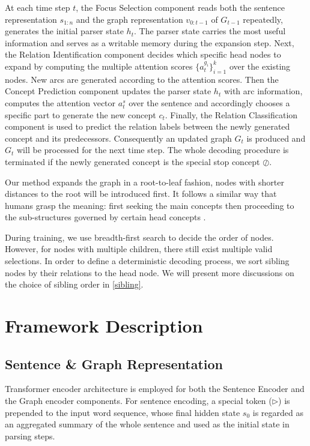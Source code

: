 \documentclass[11pt,a4paper]{article}
\begin{document}
	At each time step $t$, the Focus Selection component reads both the sentence representation $s_{1:n}$ and the graph representation $v_{0:t-1}$ of $G_{t-1}$ repeatedly, generates the initial parser state $h_t$. The parser state carries the most useful information and serves as a writable memory during the expansion step. Next, the Relation Identification component decides which specific head nodes to expand by computing the multiple attention scores $\{a^{g_i}_t\}_{i=1}^k$ over the existing nodes. New arcs are generated according to the attention scores. Then the Concept Prediction component updates the parser state $h_t$ with arc information, computes the attention vector $a^s_t$ over the sentence and accordingly chooses a specific part to generate the new concept $c_t$. Finally, the Relation Classification component is used to predict the relation labels between the newly generated concept and its predecessors. Consequently an updated graph $G_t$ is produced and $G_t$ will be processed for the next time step. The whole decoding procedure is terminated if the newly generated concept is the special stop concept $\oslash$.
	
	Our method expands the graph in a root-to-leaf fashion, nodes with shorter distances to the root will be introduced first. It follows a similar way that humans grasp the meaning: first seeking the main concepts then proceeding to the sub-structures governed by certain head concepts \cite{banarescu2013abstract}.
	
	During training, we use breadth-first search to decide the order of nodes. However, for nodes with multiple children, there still exist multiple valid selections. In order to define a deterministic decoding process, we sort sibling nodes by their relations to the head node. We will present more discussions on the choice of sibling order in \cref{sibling}.
	\section{Framework Description}
	\subsection{Sentence \& Graph Representation}
	Transformer encoder architecture is employed for both the Sentence Encoder and the Graph encoder components. For sentence encoding, a special token ($\rhd$) is prepended to the input word sequence, whose final hidden state $s_0$ is regarded as an aggregated summary of the whole sentence and used as the initial state in parsing steps.
	
\end{document}
